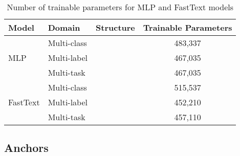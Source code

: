 \documentclass[Dissertation.tex]{subfiles}
\begin{document}
\begin{table}[]
	\caption{ Number of trainable parameters for MLP and FastText models }
	\label{tab:trainParams}
	\centering
		\begin{tabular}{lllc}
			\toprule
			Model    & Domain      & Structure & Trainable Parameters \\ \midrule
			\multirow{3}{*}{MLP}      & Multi-class &           & 483,337               \\
			& Multi-label &           & 467,035               \\
			& Multi-task  &           & 467,035               \\
			\cmidrule{2-4}
			\multirow{3}{*}{FastText} & Multi-class &           & 515,537               \\
			& Multi-label &           & 452,210               \\
			& Multi-task  &           & 457,110 \\ \bottomrule              
		\end{tabular}
	
\end{table}

\subsection{Anchors}
\end{document}
